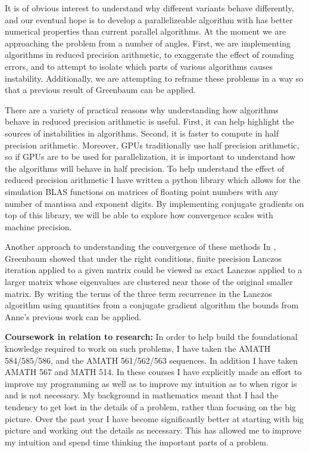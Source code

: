 \documentclass[11pt]{article}
\begin{document}
It is of obvious interest to understand why different variants behave differently, and our eventual hope is to develop a parallelizeable algorithm with has better numerical properties than current parallel algorithms. At the moment we are approaching the problem from a number of angles. First, we are implementing algorithms in reduced precision arithmetic, to exaggerate the effect of rounding errors, and to attempt to isolate which parts of various algorithms causes instability. Additionally, we are attempting to reframe these problems in a way so that a previous result \cite{perturbed_lanczos} of Greenbaum can be applied.

There are a variety of practical reasons why understanding how algorithms behave in reduced precision arithmetic is useful. First, it can help highlight the sources of instabilities in algorithms. Second, it is faster to compute in half precision arithmetic. Moreover, GPUs traditionally use half precision arithmetic, so if GPUs are to be used for parallelization, it is important to understand how the algorithms will behave in half precision. To help understand the effect of reduced precision arithmetic I have written a python library which allows for the simulation BLAS functions on matrices of floating point numbers with any number of mantissa and exponent digits. By implementing conjugate gradients on top of this library, we will be able to explore how convergence scales with machine precision.


Another approach to understanding the convergence of these methods In \cite{perturbed_lanczos}, Greenbaum showed that under the right conditions, finite precision Lanczos iteration applied to a given matrix could be viewed as exact Lanczos applied to a larger matrix whose eigenvalues are clustered near those of the original smaller matrix. By writing the terms of the three term recurrence in the Lanczos algorithm using quantities from a conjugate gradient algorithm the bounds from Anne's previous work can be applied.


\textbf{Coursework in relation to research:}
In order to help build the foundational knowledge required to work on such problems, I have taken the AMATH 584/585/586, and the AMATH 561/562/563 sequences. In addition I have taken AMATH 567 and MATH 514. In these courses I have explicitly made an effort to improve my programming as well as to improve my intuition as to when rigor is and is not necessary. My background in mathematics meant that I had the tendency to get lost in the details of a problem, rather than focusing on the big picture. Over the past year I have become significantly better at starting with big picture and working out the details as necessary. This has allowed me to improve my intuition and spend time thinking the important parts of a problem.
\end{document}

